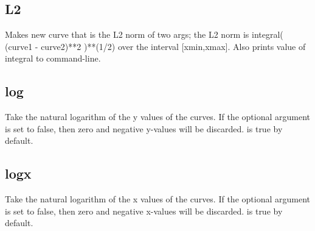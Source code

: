 \documentclass[letterpaper,10pt,english]{sphinxmanual}
\begin{document}
\subsection{L2}
\label{\detokenize{math_operations:l2}}
Makes new curve that is the L2 norm of two args; the L2 norm is integral( (curve1 - curve2)**2 )**(1/2) over the interval {[}xmin,xmax{]}. Also prints value of integral to command-line.

\begin{sphinxVerbatim}[commandchars=\\\{\}]
\PYG{p}{[}\PYG{p}{]}    \PYG{p}{[} \PYG{p}{]}
\end{sphinxVerbatim}


\subsection{log}
\label{\detokenize{math_operations:log}}
Take the natural logarithm of the y values of the curves. If the optional argument  is set to false, then zero and negative y-values will be discarded.  is true by default. 

\begin{sphinxVerbatim}[commandchars=\\\{\}]
\PYG{p}{[}\PYG{p}{]}   \PYG{p}{[}   \PYG{p}{]}
\end{sphinxVerbatim}


\subsection{logx}
\label{\detokenize{math_operations:logx}}
Take the natural logarithm of the x values of the curves. If the optional argument  is set to false, then zero and negative x-values will be discarded.  is true by default. 

\begin{sphinxVerbatim}[commandchars=\\\{\}]
\PYG{p}{[}\PYG{p}{]}   \PYG{p}{[}   \PYG{p}{]}
\end{sphinxVerbatim}
\end{document}
